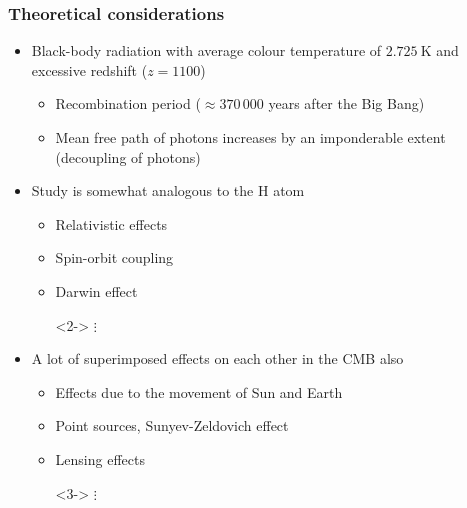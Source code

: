 \begin{frame}
\frametitle{Theoretical considerations}

\begin{itemize}
	\item<1-> Black-body radiation with average colour temperature of $2.725\ \mathrm{K}$ and excessive redshift ($z = 1100$)
	\begin{itemize}
		\item<1-> Recombination period ($\approx 370\,000$ years after the Big Bang)
		\item<1-> Mean free path of photons increases by an imponderable extent (decoupling of photons)
	\end{itemize}
	\item<2-> Study is somewhat analogous to the H atom
	\begin{itemize}
		\item<2-> Relativistic effects
		\item<2-> Spin-orbit coupling
		\item<2-> Darwin effect
		\item[]<2-> $\vdots$
	\end{itemize}
	\item<3-> A lot of superimposed effects on each other in the CMB also
	\begin{itemize}
		\item<3-> Effects due to the movement of Sun and Earth
		\item<3-> Point sources, Sunyev-Zeldovich effect
		\item<3-> Lensing effects
		\item[]<3-> $\vdots$
	\end{itemize}
\end{itemize}

\end{frame}